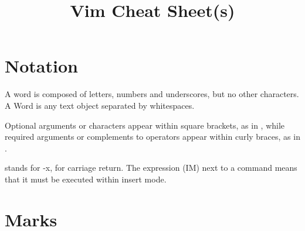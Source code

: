 \documentclass[a4paper,10pt]{amsart}
\begin{document}
\pagestyle{empty}
\title[]{Vim Cheat Sheet(s)}
\author{\href{https://github.com/pzuehlke}{}}
\maketitle




\section{Notation}\label{S:notation}
\thispagestyle{empty}


A word is composed of letters, numbers and underscores, but no other characters.
A Word is any text object separated by whitespaces. 

Optional arguments or
characters appear within square brackets, as in , while required
arguments or complements to operators appear within curly braces, as in
.

 stands for -x,  for carriage return. The
expression (IM) next to a command means that it must be executed within
insert mode. 



\section{Marks}\label{S:marks}
\end{document}
